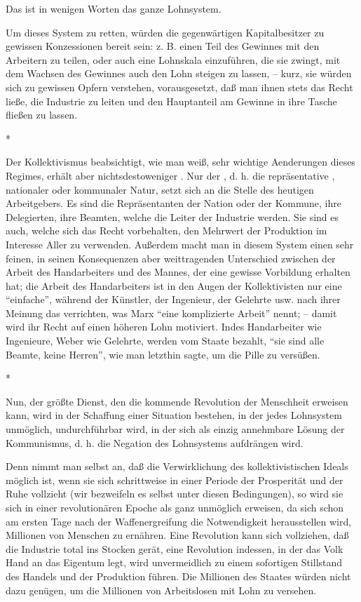 \documentclass{scrbook}
\begin{document}
Das ist in wenigen Worten das ganze Lohnsystem.

Um dieses System zu retten, würden die gegenwärtigen Kapitalbesitzer zu gewissen Konzessionen bereit sein: z. B. einen Teil des Gewinnes mit den Arbeitern zu teilen, oder auch eine Lohnskala einzuführen, die sie zwingt, mit dem Wachsen des Gewinnes auch den Lohn steigen zu lassen, – kurz, sie würden sich zu gewissen Opfern verstehen, vorausgesetzt, daß man ihnen stets das Recht ließe, die Industrie zu leiten und den Hauptanteil am Gewinne in ihre Tasche fließen zu lassen.

\begin{center}*\end{center}

Der Kollektivismus beabsichtigt, wie man weiß, sehr wichtige Aenderungen dieses Regimes, erhält aber nichtsdestoweniger . Nur der , d. h. die repräsentative , nationaler oder kommunaler Natur, setzt sich an die Stelle des heutigen Arbeitgebers. Es sind die Repräsentanten der Nation oder der Kommune, ihre Delegierten, ihre Beamten, welche die Leiter der Industrie werden. Sie sind es auch, welche sich das Recht vorbehalten, den Mehrwert der Produktion im Interesse Aller zu verwenden. Außerdem macht man in diesem System einen sehr feinen, in seinen Konsequenzen aber weittragenden Unterschied zwischen der Arbeit des Handarbeiters und des Mannes, der eine gewisse Vorbildung erhalten hat; die Arbeit des Handarbeiters ist in den Augen der Kollektivisten nur eine ``einfache'', während der Künstler, der Ingenieur, der Gelehrte usw. nach ihrer Meinung das verrichten, was Marx ``eine komplizierte Arbeit'' nennt; – damit wird ihr Recht auf einen höheren Lohn motiviert. Indes Handarbeiter wie Ingenieure, Weber wie Gelehrte, werden vom Staate bezahlt, ``sie sind alle Beamte, keine Herren'', wie man letzthin sagte, um die Pille zu versüßen.

\begin{center}*\end{center}

Nun, der größte Dienst, den die kommende Revolution der Menschheit erweisen kann, wird in der Schaffung einer Situation bestehen, in der jedes Lohnsystem unmöglich, undurchführbar wird, in der sich als einzig annehmbare Lösung der Kommunismus, d. h. die Negation des Lohnsystems aufdrängen wird.

Denn nimmt man selbst an, daß die Verwirklichung des kollektivistischen Ideals möglich ist, wenn sie sich schrittweise in einer Periode der Prosperität und der Ruhe vollzieht (wir bezweifeln es selbst unter diesen Bedingungen), so wird sie sich in einer revolutionären Epoche als ganz unmöglich erweisen, da sich schon am ersten Tage nach der Waffenergreifung die Notwendigkeit herausstellen wird, Millionen von Menschen zu ernähren. Eine  Revolution kann sich vollziehen,  daß die Industrie total ins Stocken gerät, eine Revolution indessen, in der das Volk Hand an das Eigentum legt, wird unvermeidlich zu einem sofortigen Stillstand des Handels und der Produktion führen. Die Millionen des Staates würden nicht dazu genügen, um die Millionen von Arbeitslosen mit Lohn zu versehen.
\end{document}
